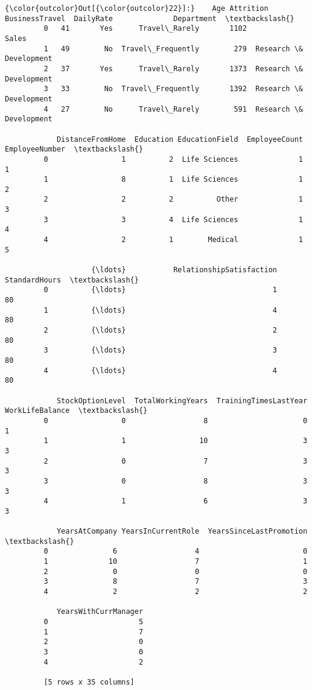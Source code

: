 \documentclass[11pt]{article}
\begin{document}
\begin{Verbatim}[commandchars=\\\{\}]
{\color{outcolor}Out[{\color{outcolor}22}]:}    Age Attrition     BusinessTravel  DailyRate              Department  \textbackslash{}
         0   41       Yes      Travel\_Rarely       1102                   Sales   
         1   49        No  Travel\_Frequently        279  Research \& Development   
         2   37       Yes      Travel\_Rarely       1373  Research \& Development   
         3   33        No  Travel\_Frequently       1392  Research \& Development   
         4   27        No      Travel\_Rarely        591  Research \& Development   
         
            DistanceFromHome  Education EducationField  EmployeeCount  EmployeeNumber  \textbackslash{}
         0                 1          2  Life Sciences              1               1   
         1                 8          1  Life Sciences              1               2   
         2                 2          2          Other              1               3   
         3                 3          4  Life Sciences              1               4   
         4                 2          1        Medical              1               5   
         
                    {\ldots}           RelationshipSatisfaction StandardHours  \textbackslash{}
         0          {\ldots}                                  1            80   
         1          {\ldots}                                  4            80   
         2          {\ldots}                                  2            80   
         3          {\ldots}                                  3            80   
         4          {\ldots}                                  4            80   
         
            StockOptionLevel  TotalWorkingYears  TrainingTimesLastYear WorkLifeBalance  \textbackslash{}
         0                 0                  8                      0               1   
         1                 1                 10                      3               3   
         2                 0                  7                      3               3   
         3                 0                  8                      3               3   
         4                 1                  6                      3               3   
         
            YearsAtCompany YearsInCurrentRole  YearsSinceLastPromotion  \textbackslash{}
         0               6                  4                        0   
         1              10                  7                        1   
         2               0                  0                        0   
         3               8                  7                        3   
         4               2                  2                        2   
         
            YearsWithCurrManager  
         0                     5  
         1                     7  
         2                     0  
         3                     0  
         4                     2  
         
         [5 rows x 35 columns]
\end{Verbatim}
            
\end{document}
